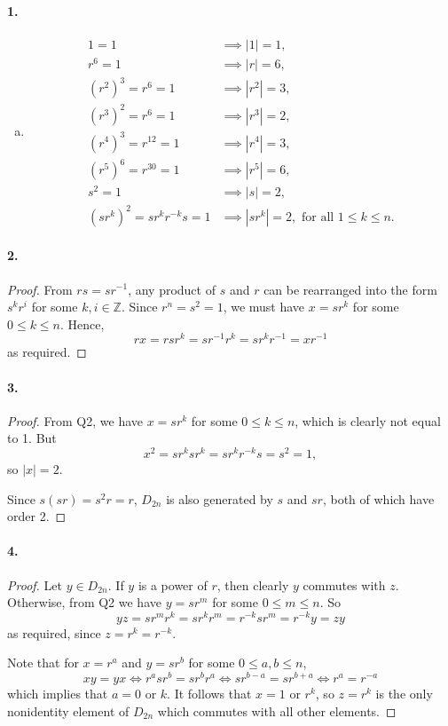 \documentclass{article}
\begin{document}
\paragraph{1.}
\begin{enumerate}[(a)]
  \item \begin{align*}
      1 = 1 &\implies |1| = 1, \\
      r^6 = 1 &\implies |r| = 6, \\
      (r^2)^3 = r^6 = 1 &\implies |r^2| = 3, \\
      (r^3)^2 = r^6 = 1 &\implies |r^3| = 2, \\
      (r^4)^3 = r^{12} = 1 &\implies |r^4| = 3, \\
      (r^5)^6 = r^{30} = 1 &\implies |r^5| = 6, \\
      s^2 = 1 &\implies |s| = 2, \\
      (sr^k)^2 = sr^kr^{-k}s = 1 &\implies |sr^k| = 2, \text{ for all } 1
      \leq k \leq n.
    \end{align*}
\end{enumerate}

\paragraph{2.}
\begin{proof}
  From $rs = sr^{-1}$, any product of $s$ and $r$ can be rearranged into the
  form $s^kr^i$ for some $k, i \in \mathbb{Z}$. Since $r^n = s^2 = 1$, we must
  have $x = sr^k$ for some $0 \leq k \leq n$. Hence, \[
    rx = rsr^k = sr^{-1}r^k = sr^kr^{-1} = xr^{-1}
  \] as required.
\end{proof}

\paragraph{3.}
\begin{proof}
  From Q2, we have $x = sr^k$ for some $0 \leq k \leq n$, which is clearly not
  equal to 1. But \[
    x^2 = sr^ksr^k = sr^kr^{-k}s = s^2 = 1,
  \] so $|x| = 2$.

  Since $s(sr) = s^2r = r$, $D_{2n}$ is also generated by $s$ and $sr$, both of
  which have order 2.
\end{proof}

\paragraph{4.}
\begin{proof}
  Let $y \in D_{2n}$. If $y$ is a power of $r$, then clearly $y$ commutes with
  $z$. Otherwise, from Q2 we have $y = sr^m$ for some $0 \leq m \leq n$. So \[
    yz = sr^mr^k = sr^kr^m = r^{-k}sr^m = r^{-k}y = zy
  \] as required, since $z = r^k = r^{-k}$.

  Note that for $x = r^a$ and $y = sr^b$ for some $0 \leq a, b \leq n$, \[
    xy = yx \iff r^asr^b = sr^br^a \iff sr^{b-a} = sr^{b+a} \iff r^a = r^{-a}
  \] which implies that $a = 0\text{ or }k$. It follows that $x =
  1\text{ or }r^k$, so $z = r^k$ is the only nonidentity element of $D_{2n}$
  which commutes with all other elements.
\end{proof}
\end{document}
